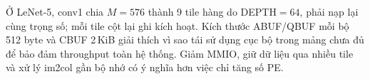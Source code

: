 Ở LeNet-5, conv1 chia $M=576$ thành 9 tile hàng do DEPTH$=64$, phải nạp lại cùng trọng số; mỗi tile cột lại ghi kích hoạt. Kích thước ABUF/QBUF mỗi bộ 512 byte và CBUF 2\,KiB giải thích vì sao tái sử dụng cục bộ trong mảng chưa đủ để bảo đảm throughput toàn hệ thống. Giảm MMIO, giữ dữ liệu qua nhiều tile và xử lý im2col gần bộ nhớ có ý nghĩa hơn việc chỉ tăng số PE.
